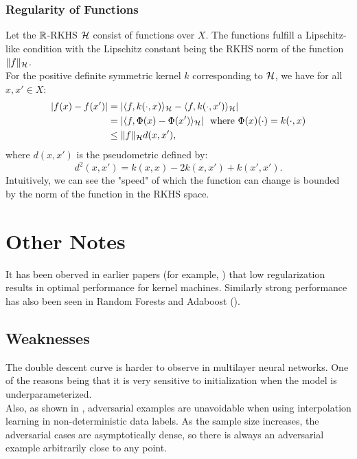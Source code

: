\documentclass[twoside]{memoir}
\begin{document}
\subsection{Regularity of Functions}
Let the $\mathbb{R}$-RKHS $\mathcal{H}$ consist of functions over $X$. The functions fulfill a Lipschitz-like condition with the Lipschitz constant being the RKHS norm of the function $\lVert f\rVert_{\mathcal{H}}$.\\
For the positive definite symmetric kernel $k$ corresponding to $\mathcal{H}$, we have for all $x, x' \in X$:
\begin{equation*}
\begin{split}
|f(x) - f(x')| &= |\langle f, k(\cdot, x)\rangle_{\mathcal{H}} - \langle f, k(\cdot, x')\rangle_{\mathcal{H}}| \\
&= |\langle f, \Phi(x) - \Phi(x')\rangle_{\mathcal{H}}| ~ \text{ where }  \Phi(x)(\cdot) = k(\cdot, x)\\
&\leq \lVert f\rVert_{\mathcal{H}} d(x, x'),
\end{split}
\end{equation*}
where $d(x, x')$ is the pseudometric defined by:
\[ d^2(x, x') = k(x, x) - 2k(x, x') + k(x', x'). \]
Intuitively, we can see the "speed" of which the function can change is bounded by the norm of the function in the RKHS space.

\chapter{Other Notes}
It has been oberved in earlier papers (for example, \cite{Shalev_Shwartz_2010}) that low regularization results in optimal performance for kernel machines. Similarly strong performance has also been seen in Random Forests and Adaboost (\cite{Random_Forests_2017}).

\section{Weaknesses}
The double descent curve is harder to observe in multilayer neural networks. One of the reasons being that it is very sensitive to initialization when the model is underparameterized.\\
Also, as shown in \cite{Belkin_Overfitting}, adversarial examples are unavoidable when using interpolation learning in non-deterministic data labels. As the sample size increases, the adversarial cases are asymptotically dense, so there is always an adversarial example arbitrarily close to any point.


\appendix
\end{document}
